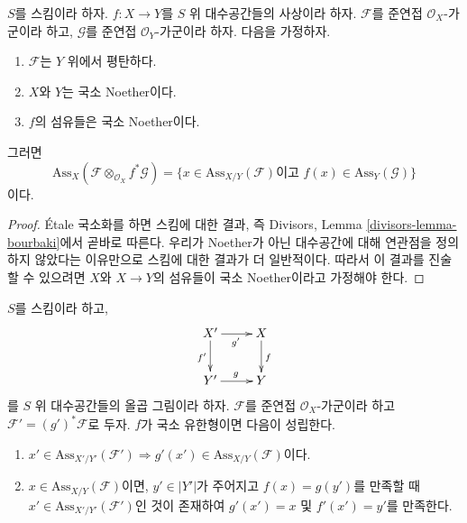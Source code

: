 \begin{lemma}
\label{lemma-bourbaki}
$S$를 스킴이라 하자. $f : X \to Y$를 $S$ 위 대수공간들의 사상이라 하자.
$\mathcal{F}$를 준연접 $\mathcal{O}_X$-가군이라 하고,
$\mathcal{G}$를 준연접 $\mathcal{O}_Y$-가군이라 하자. 다음을 가정하자.
\begin{enumerate}
\item $\mathcal{F}$는 $Y$ 위에서 평탄하다.
\item $X$와 $Y$는 국소 Noether이다.
\item $f$의 섬유들은 국소 Noether이다.
\end{enumerate}
그러면
$$
\text{Ass}_X(\mathcal{F} \otimes_{\mathcal{O}_X} f^*\mathcal{G}) =
\{x \in \text{Ass}_{X/Y}(\mathcal{F})\text{이고 }
f(x) \in \text{Ass}_Y(\mathcal{G})\}
$$
이다.
\end{lemma}

\begin{proof}
\'Etale 국소화를 하면 스킴에 대한 결과, 즉 Divisors, Lemma
\ref{divisors-lemma-bourbaki}에서 곧바로 따른다. 우리가 Noether가 아닌
대수공간에 대해 연관점을 정의하지 않았다는 이유만으로 스킴에 대한 결과가
더 일반적이다. 따라서 이 결과를 진술할 수 있으려면 $X$와
$X \to Y$의 섬유들이 국소 Noether이라고 가정해야 한다.
\end{proof}

\begin{lemma}
\label{lemma-base-change-relative-assassin}
$S$를 스킴이라 하고,
$$
\xymatrix{
X' \ar[d]_{f'} \ar[r]_{g'} & X \ar[d]^f \\
Y' \ar[r]^g & Y
}
$$
를 $S$ 위 대수공간들의 올곱 그림이라 하자. $\mathcal{F}$를 준연접
$\mathcal{O}_X$-가군이라 하고 $\mathcal{F}' = (g')^*\mathcal{F}$로 두자.
$f$가 국소 유한형이면 다음이 성립한다.
\begin{enumerate}
\item $x' \in \text{Ass}_{X'/Y'}(\mathcal{F}')
\Rightarrow g'(x') \in \text{Ass}_{X/Y}(\mathcal{F})$이다.
\item $x \in \text{Ass}_{X/Y}(\mathcal{F})$이면,
$y' \in |Y'|$가 주어지고 $f(x) = g(y')$를 만족할 때
$x' \in \text{Ass}_{X'/Y'}(\mathcal{F}')$인 것이 존재하여
$g'(x') = x$ 및 $f'(x') = y'$를 만족한다.
\end{enumerate}
\end{lemma}

